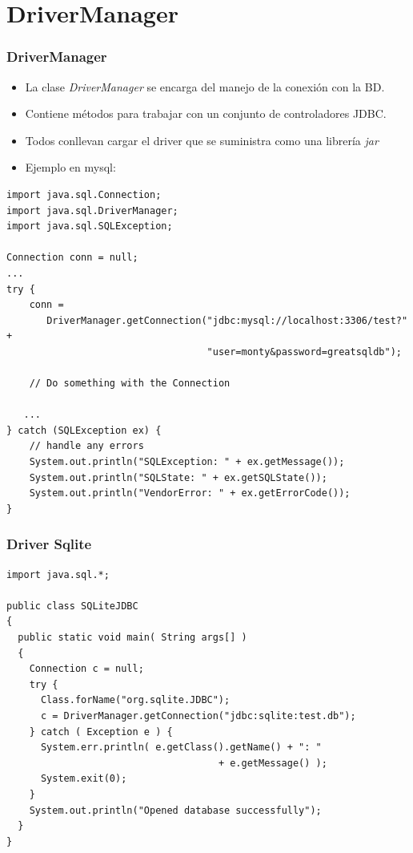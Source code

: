 \documentclass{beamer}
\begin{document}
\section{DriverManager}
\begin{frame}[fragile]
\frametitle{DriverManager}
\begin{itemize}[<+->]
\item La clase \emph{DriverManager} se encarga del manejo de la conexión con la BD.
\item Contiene métodos para trabajar con un conjunto de controladores JDBC.
\item Todos conllevan cargar el driver que se suministra como una librería \emph{jar}
\item Ejemplo en mysql:
\end{itemize}
\pause
\begin{tiny}
\begin{verbatim}
import java.sql.Connection;
import java.sql.DriverManager;
import java.sql.SQLException;

Connection conn = null;
...
try {
    conn =
       DriverManager.getConnection("jdbc:mysql://localhost:3306/test?" +
                                   "user=monty&password=greatsqldb");

    // Do something with the Connection

   ...
} catch (SQLException ex) {
    // handle any errors
    System.out.println("SQLException: " + ex.getMessage());
    System.out.println("SQLState: " + ex.getSQLState());
    System.out.println("VendorError: " + ex.getErrorCode());
}
\end{verbatim}
\end{tiny}
\end{frame}


\begin{frame}[fragile]
\frametitle{Driver Sqlite}
\begin{footnotesize}
\begin{verbatim}
import java.sql.*;

public class SQLiteJDBC
{
  public static void main( String args[] )
  {
    Connection c = null;
    try {
      Class.forName("org.sqlite.JDBC");
      c = DriverManager.getConnection("jdbc:sqlite:test.db");
    } catch ( Exception e ) {
      System.err.println( e.getClass().getName() + ": " 
                                     + e.getMessage() );
      System.exit(0);
    }
    System.out.println("Opened database successfully");
  }
}
\end{verbatim}
\end{footnotesize}
\end{frame}
\end{document}
